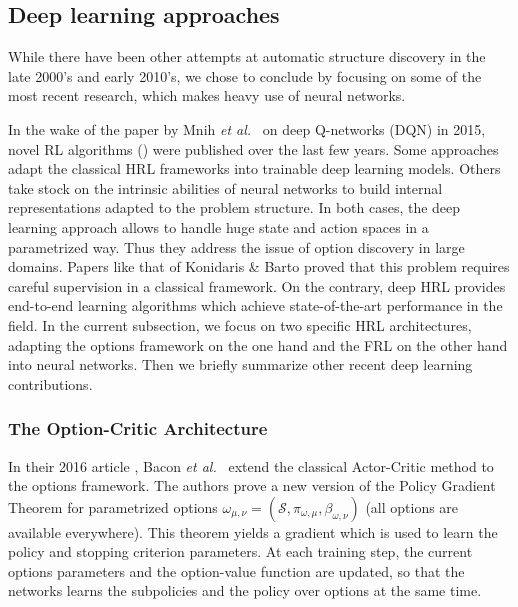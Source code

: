\documentclass{article}
\newcommand{\etal}{\textit{et al.}}
\begin{document}
\subsection{Deep learning approaches}

While there have been other attempts at automatic structure discovery in the late 2000's and early 2010's, we chose to conclude by focusing on some of the most recent research, which makes heavy use of neural networks.

In the wake of the paper by Mnih \etal~\cite{mnih_human-level_2015} on deep Q-networks (DQN) in 2015, novel RL algorithms (\cite{alexander_strategic_2016, bacon_option-critic_2016, casanueva_feudal_2018, florensa_stochastic_2017, kulkarni_hierarchical_2016}) were published over the last few years. Some approaches adapt the classical HRL frameworks into trainable deep learning models. Others take stock on the intrinsic abilities of neural networks to build internal representations adapted to the problem structure. In both cases, the deep learning approach allows to handle huge state and action spaces in a parametrized way. Thus they address the issue of option discovery in large domains. Papers like that of Konidaris \& Barto \cite{konidaris_skill_2009} proved that this problem requires careful supervision in a classical framework. On the contrary, deep HRL provides end-to-end learning algorithms which achieve state-of-the-art performance in the field. In the current subsection, we focus on two specific HRL architectures, adapting the options framework on the one hand and the FRL on the other hand into neural networks. Then we briefly summarize other recent deep learning contributions.

\subsubsection{The Option-Critic Architecture}

In their 2016 article \cite{bacon_option-critic_2016}, Bacon \etal~ extend the classical Actor-Critic method to the options framework. The authors prove a new version of the Policy Gradient Theorem for parametrized options $\omega_{\mu, \nu} = (\mathcal{S}, \pi_{\omega, \mu}, \beta_{\omega, \nu})$ (all options are available everywhere). This theorem yields a gradient which is used to learn the policy and stopping criterion parameters. At each training step, the current options parameters and the option-value function are updated, so that the networks learns the subpolicies and the policy over options at the same time.
\end{document}

